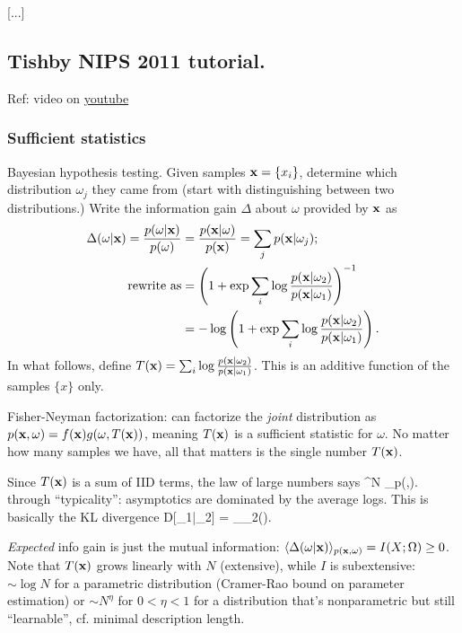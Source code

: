 \documentclass[notitlepage,openany,11pt]{report}
\theoremstyle{plain}%
\numberwithin{equation}{section}
\begin{document}
[...]

\subsection{Tishby NIPS 2011 tutorial.} Ref: video on \href{https://www.youtube.com/watch?v=GKm53xGbAOk}{youtube}

\subsubsection{Sufficient statistics}
Bayesian hypothesis testing. Given samples $\mathbf{x} = \{x_{i}\}$, determine which distribution $\omega_{j}$ they came from (start with distinguishing between two distributions.) Write the information gain $\Delta$ about $\omega$ provided by $\mathbf{x}$ as
\begin{align*}
\Delta(\omega|\mathbf{x}) = \frac{p(\omega|\mathbf{x})}{p(\omega)} &= \frac{p(\mathbf{x}|\omega)}{p(\mathbf{x})} = \sum_{j}p(\mathbf{x}|\omega_{j}); \\
\text{rewrite as}   &= \left( 1+ \exp \sum_{i} \log \frac{p(\mathbf{x}|\omega_{2})}{p(\mathbf{x}|\omega_{1})} \right)^{-1} \\
&= - \log \left( 1 + \exp \sum_{i} \log \frac{p(\mathbf{x}|\omega_{2})}{p(\mathbf{x}|\omega_{1})} \right).
\end{align*}
In what follows, define $T(\mathbf{x}) = \sum_{i} \log \frac{p(\mathbf{x}|\omega_{2})}{p(\mathbf{x}|\omega_{1})}$. This is an additive function of the samples $\{x\}$ only.

Fisher-Neyman factorization: can factorize the \emph{joint} distribution as $p(\mathbf{x},\omega) = f(\mathbf{x})g(\omega, T(\mathbf{x}))$, meaning $T(\mathbf{x})$ is a sufficient statistic for $\omega$. No matter how many samples we have, all that matters is the single number $T(\mathbf{x})$. 

Since $T(\mathbf{x})$ is a sum of IID terms, the law of large numbers says 
\be
{} \sum^{N} \log {} 
\left\langle \log {} \right\rangle_{p(,\omega)}.
\ee
through ``typicality'': asymptotics are dominated by the average logs. This is basically the KL divergence
 \leq D[\omega_{1}|\omega_{2}] = \left\langle \log {} \right\rangle_{\omega_{2}()}.
\ee

\emph{Expected} info gain is just the mutual information: $\langle \Delta(\omega|\mathbf{x}) \rangle_{p(\mathbf{x}, \omega)} = I(X; \Omega) \geq 0$. Note that $T(\mathbf{x})$ grows linearly with $N$ (extensive), while $I$ is subextensive: $\sim \log N$ for a parametric distribution (Cramer-Rao bound on parameter estimation) or $\sim N^{\eta}$ for $0 < \eta < 1$ for a distribution that's nonparametric but still ``learnable'', cf. minimal description length. 
\end{document}
